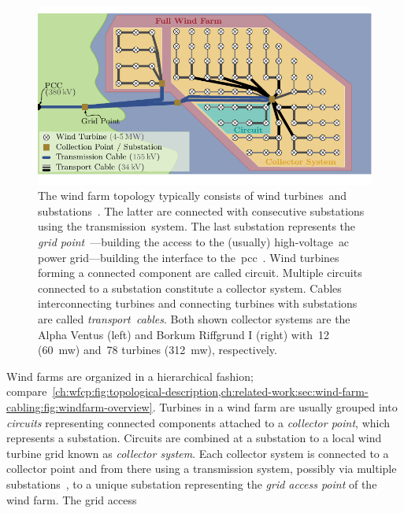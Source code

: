 \begin{figure}[t!]
    \centering
    \includegraphics[page=1,scale=1]
    {windfarmplacement/figures/windparklayerCROP.pdf}
    \caption[The description of the wind farm topology.]{The wind farm topology
    typically consists of wind turbines~\tikzTurbine and
    substations~\mbox{\tikzSubstation.} The latter are connected with
    consecutive substations using the \mbox{transmission
    system\tikzTransmissionCable}. The last substation represents the \emph{grid
    point}~\tikzSubstation---building the access to the (usually)
    high-voltage~\gls{ac} power grid---building the interface to
    the~\gls{pcc}~\tikzPCC. Wind turbines forming a connected component are
    called circuit. Multiple circuits connected to a substation constitute a
    collector system. Cables interconnecting turbines and connecting turbines
    with substations are called
    \mbox{\emph{transport cables}\tikzTransportCable}. Both shown collector
    systems are the Alpha Ventus (left) and Borkum Riffgrund I (right) with~12
    (\SI{60}{\gls{mw}}) and~78 turbines (\SI{312}{\gls{mw}}),
    respectively.}
    \label{ch:wfcp:fig:topological-description}
\end{figure}
%
Wind farms are organized in a hierarchical fashion;
compare~\cref{ch:wfcp:fig:topological-description,ch:related-work:sec:wind-farm-cabling:fig:windfarm-overview}.
Turbines in a wind farm are usually grouped into \emph{circuits} representing
connected components attached to a \emph{collector point}, which represents a
substation. Circuits are combined at a substation to a local wind turbine grid
known as \emph{collector system}. Each collector system is connected to a
collector point and from there using a transmission system, possibly via
multiple substations~\parencite{online:BARD1substation}, to a unique substation
representing the \emph{grid access point} of the wind farm. The grid access
